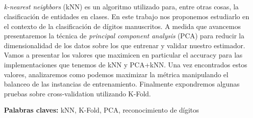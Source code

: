 \begin{addmargin}[5em]{5em}
\section*{\centering \runtitulo}

\noindent \textit{k-nearest neighbors} (kNN) es un algoritmo utilizado para, entre otras cosas, la clasificación de entidades en clases. En este trabajo nos proponemos estudiarlo en el contexto de la clasificación de dígitos manuscritos. A medida que avancemos presentaremos la técnica de \textit{principal component analysis} (PCA) para reducir la dimensionalidad de los datos sobre los que entrenar y validar nuestro estimador. Vamos a presentar los valores que maximicen en particular el accuracy para las implementaciones que tenemos de kNN y PCA+kNN. Una vez encontrados estos valores, analizaremos como podemos maximizar la métrica manipulando el balanceo de las instancias de entrenamiento. Finalmente expondremos algunas pruebas sobre cross-validation utilizando K-Fold.

\bigskip

\noindent\textbf{Palabras claves:} kNN, K-Fold, PCA, reconocimiento de dígitos
\end{addmargin}
